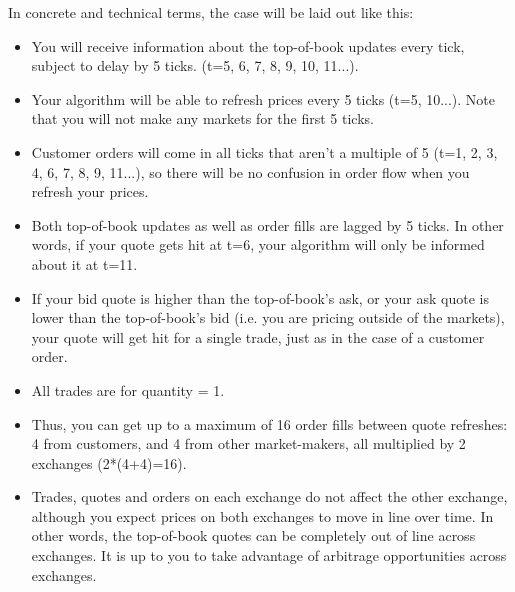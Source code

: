 \documentclass[12pt]{article}
\begin{document}
In concrete and technical terms, the case will be laid out like this:
\begin{itemize}
  \item You will receive information about the top-of-book updates every tick, subject to delay by 5 ticks. (t=5, 6, 7, 8, 9, 10, 11...).
  \item Your algorithm will be able to refresh prices every 5 ticks (t=5, 10...). Note that you will not make any markets for the first 5 ticks.%
  \item Customer orders will come in all ticks that aren’t a multiple of 5 (t=1, 2, 3, 4, 6, 7, 8, 9, 11...), so there will be no confusion in order flow when you refresh your prices.
  \item Both top-of-book updates as well as order fills are lagged by 5 ticks. In other words, if your quote gets hit at t=6, your algorithm will only be informed about it at t=11.
  \item If your bid quote is higher than the top-of-book’s ask, or your ask quote is lower than the top-of-book’s bid (i.e. you are pricing outside of the markets), your quote will get hit for a single trade, just as in the case of a customer order.
  \item All trades are for quantity = 1.
  \item Thus, you can get up to a maximum of 16 order fills between quote refreshes: 4 from customers, and 4 from other market-makers, all multiplied by 2 exchanges (2*(4+4)=16).
  \item Trades, quotes and orders on each exchange do not affect the other exchange, although you expect prices on both exchanges to move in line over time. In other words, the top-of-book quotes can be completely out of line across exchanges. It is up to you to take advantage of arbitrage opportunities across exchanges.
\end{itemize}
\end{document}
